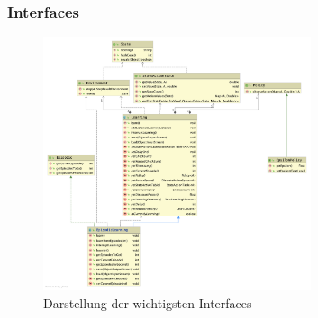 \subsubsection{Interfaces}
\begin{figure}[H]
    \centering
    \includegraphics[width=0.7\textwidth]{images/Interfaces.png}
    \caption{Darstellung der wichtigsten Interfaces}
    \label{fig:GPI}
\end{figure}